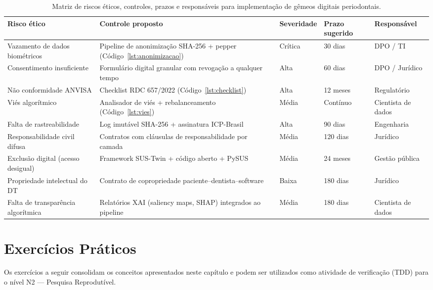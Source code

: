 \begin{table}[htbp]
\centering
\footnotesize
\caption{Matriz de riscos éticos, controles, prazos e responsáveis para implementação de gêmeos digitais periodontais.}
\label{tab:riscos-eticos}
\begin{tabular}{|p{3.2cm}|p{3.5cm}|p{1.8cm}|p{3cm}|p{2cm}|}
\hline
\textbf{Risco ético} & \textbf{Controle proposto} & \textbf{Severidade} & \textbf{Prazo sugerido} & \textbf{Responsável} \\
\hline
Vazamento de dados biométricos & Pipeline de anonimização SHA-256 + pepper (Código~\ref{lst:anonimizacao}) & Crítica & 30 dias & DPO / TI \\
\hline
Consentimento insuficiente & Formulário digital granular com revogação a qualquer tempo & Alta & 60 dias & DPO / Jurídico \\
\hline
Não conformidade ANVISA & Checklist RDC 657/2022 (Código~\ref{lst:checklist}) & Alta & 12 meses & Regulatório \\
\hline
Viés algorítmico & Analisador de viés + rebalanceamento (Código~\ref{lst:vies}) & Média & Contínuo & Cientista de dados \\
\hline
Falta de rastreabilidade & Log imutável SHA-256 + assinatura ICP-Brasil & Alta & 90 dias & Engenharia \\
\hline
Responsabilidade civil difusa & Contratos com cláusulas de responsabilidade por camada & Média & 120 dias & Jurídico \\
\hline
Exclusão digital (acesso desigual) & Framework SUS-Twin + código aberto + PySUS & Média & 24 meses & Gestão pública \\
\hline
Propriedade intelectual do DT & Contrato de copropriedade paciente--dentista--software & Baixa & 180 dias & Jurídico \\
\hline
Falta de transparência algorítmica & Relatórios XAI (saliency maps, SHAP) integrados ao pipeline & Média & 180 dias & Cientista de dados \\
\hline
\end{tabular}
\end{table}

\section{Exercícios Práticos}

Os exercícios a seguir consolidam os conceitos apresentados neste capítulo e podem ser utilizados como atividade de verificação (TDD) para o nível N2 — Pesquisa Reprodutível.

